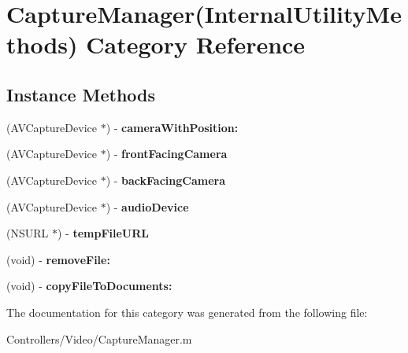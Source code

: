 \hypertarget{category_capture_manager_07_internal_utility_methods_08}{}\section{Capture\+Manager(Internal\+Utility\+Methods) Category Reference}
\label{category_capture_manager_07_internal_utility_methods_08}
\subsection*{Instance Methods}
\begin{DoxyCompactItemize}
\item 
\hypertarget{category_capture_manager_07_internal_utility_methods_08_a3bfa880d6deb2f636aee108d5705ac42}{}(A\+V\+Capture\+Device $\ast$) -\/ {\bfseries camera\+With\+Position\+:}\label{category_capture_manager_07_internal_utility_methods_08_a3bfa880d6deb2f636aee108d5705ac42}

\item 
\hypertarget{category_capture_manager_07_internal_utility_methods_08_adc90f44e828eaae0fb290e496906c2c0}{}(A\+V\+Capture\+Device $\ast$) -\/ {\bfseries front\+Facing\+Camera}\label{category_capture_manager_07_internal_utility_methods_08_adc90f44e828eaae0fb290e496906c2c0}

\item 
\hypertarget{category_capture_manager_07_internal_utility_methods_08_ae74275abdc37360582b8cbafcc975bf6}{}(A\+V\+Capture\+Device $\ast$) -\/ {\bfseries back\+Facing\+Camera}\label{category_capture_manager_07_internal_utility_methods_08_ae74275abdc37360582b8cbafcc975bf6}

\item 
\hypertarget{category_capture_manager_07_internal_utility_methods_08_aef10d6fc1d838f5267b93b858d2d02e9}{}(A\+V\+Capture\+Device $\ast$) -\/ {\bfseries audio\+Device}\label{category_capture_manager_07_internal_utility_methods_08_aef10d6fc1d838f5267b93b858d2d02e9}

\item 
\hypertarget{category_capture_manager_07_internal_utility_methods_08_af1f63671133f1fe0a965f893b58bfedc}{}(N\+S\+U\+R\+L $\ast$) -\/ {\bfseries temp\+File\+U\+R\+L}\label{category_capture_manager_07_internal_utility_methods_08_af1f63671133f1fe0a965f893b58bfedc}

\item 
\hypertarget{category_capture_manager_07_internal_utility_methods_08_accf9004d2295cc74376366aa0e3ae300}{}(void) -\/ {\bfseries remove\+File\+:}\label{category_capture_manager_07_internal_utility_methods_08_accf9004d2295cc74376366aa0e3ae300}

\item 
\hypertarget{category_capture_manager_07_internal_utility_methods_08_a095aee5cf88af3f33804800aa3b908a5}{}(void) -\/ {\bfseries copy\+File\+To\+Documents\+:}\label{category_capture_manager_07_internal_utility_methods_08_a095aee5cf88af3f33804800aa3b908a5}

\end{DoxyCompactItemize}


The documentation for this category was generated from the following file\+:\begin{DoxyCompactItemize}
\item 
Controllers/\+Video/Capture\+Manager.\+m\end{DoxyCompactItemize}
